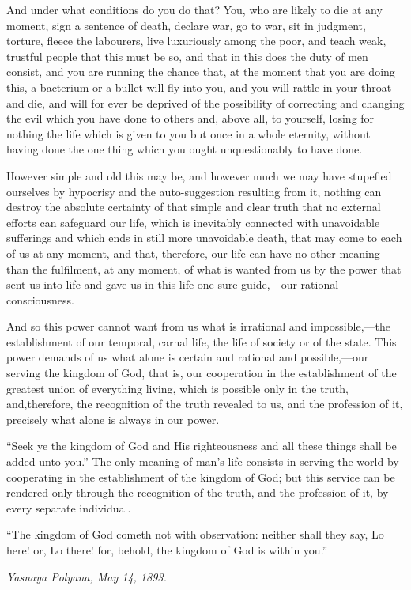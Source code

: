 \documentclass{book}
\begin{document}
And under what conditions do you do that? You, who are likely to die at any moment, sign a sentence of death, declare war, go to war, sit in judgment, torture, fleece the labourers, live luxuriously among the poor, and teach weak, trustful people that this must be so, and that in this does the duty of men consist, and you are running the chance that, at the moment that you are doing this, a bacterium or a bullet will fly into you, and you will rattle in your throat and die, and will for ever be deprived of the possibility of correcting and changing the evil which you have done to others and, above all, to yourself, losing for nothing the life which is given to you but once in a whole eternity, without having done the one thing which you ought unquestionably to have done.

However simple and old this may be, and however much we may have stupefied ourselves by hypocrisy and the auto-suggestion resulting from it, nothing can destroy the absolute certainty of that simple and clear truth that no external efforts can safeguard our life, which is inevitably connected with unavoidable sufferings and which ends in still more unavoidable death, that may come to each of us at any moment, and that, therefore, our life can have no other meaning than the fulfilment, at any moment, of what is wanted from us by the power that sent us into life and gave us in this life one sure guide,—our rational consciousness.

And so this power cannot want from us what is irrational and impossible,—the establishment of our temporal, carnal life, the life of society or of the state. This power demands of us what alone is certain and rational and possible,—our serving the kingdom of God, that is, our cooperation in the establishment of the greatest union of everything living, which is possible only in the truth, and,therefore, the recognition of the truth revealed to us, and the profession of it, precisely what alone is always in our power.

“Seek ye the kingdom of God and His righteousness and all these things shall be added unto you.” The only meaning of man’s life consists in serving the world by cooperating in the establishment of the kingdom of God; but this service can be rendered only through the recognition of the truth, and the profession of it, by every separate individual.

“The kingdom of God cometh not with observation: neither shall they say, Lo here! or, Lo there! for, behold, the kingdom of God is within you.”

\emph{Yasnaya Polyana, May 14, 1893.}
\end{document}
